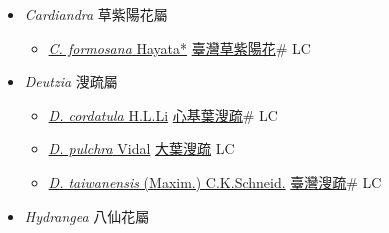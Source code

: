 
  \begin{itemize}
 \item[] \textit{Cardiandra} 草紫陽花屬
                    
  \begin{itemize}
        \item[] \href{http://www.theplantlist.org/tpl1.1/search?q=Cardiandra+formosana}{\textit{C. formosana} Hayata*}   \href{\detokenize{http://taibnet.sinica.edu.tw/chi/taibnet_species_list.php?T2=臺灣草紫陽花&T2_new_value=true&fr=y}}{臺灣草紫陽花}\# LC
  \end{itemize}
 \item[] \textit{Deutzia} 溲疏屬
                    
  \begin{itemize}
        \item[] \href{http://www.theplantlist.org/tpl1.1/search?q=Deutzia+cordatula}{\textit{D. cordatula} H.L.Li}   \href{\detokenize{http://taibnet.sinica.edu.tw/chi/taibnet_species_list.php?T2=心基葉溲疏&T2_new_value=true&fr=y}}{心基葉溲疏}\# LC
        \item[] \href{http://www.theplantlist.org/tpl1.1/search?q=Deutzia+pulchra}{\textit{D. pulchra} Vidal}   \href{\detokenize{http://taibnet.sinica.edu.tw/chi/taibnet_species_list.php?T2=大葉溲疏&T2_new_value=true&fr=y}}{大葉溲疏} LC
        \item[] \href{http://www.theplantlist.org/tpl1.1/search?q=Deutzia+taiwanensis}{\textit{D. taiwanensis} (Maxim.) C.K.Schneid.}   \href{\detokenize{http://taibnet.sinica.edu.tw/chi/taibnet_species_list.php?T2=臺灣溲疏&T2_new_value=true&fr=y}}{臺灣溲疏}\# LC
  \end{itemize}
 \item[] \textit{Hydrangea} 八仙花屬
                    

\end{itemize}
